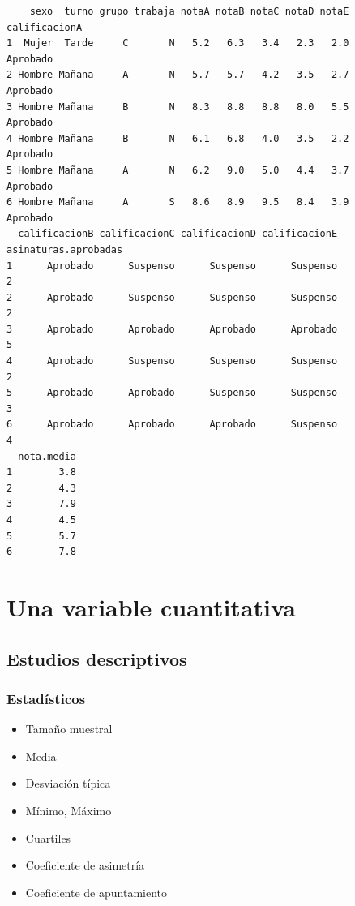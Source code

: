 \documentclass[
  spanish,
  a4paper,
]{scrreport}
\providecommand{\tightlist}{%
  \setlength{\itemsep}{0pt}\setlength{\parskip}{0pt}}
\theoremstyle{definition}
\theoremstyle{definition}
\theoremstyle{remark}
\begin{document}
\begin{verbatim}
    sexo  turno grupo trabaja notaA notaB notaC notaD notaE calificacionA
1  Mujer  Tarde     C       N   5.2   6.3   3.4   2.3   2.0      Aprobado
2 Hombre Mañana     A       N   5.7   5.7   4.2   3.5   2.7      Aprobado
3 Hombre Mañana     B       N   8.3   8.8   8.8   8.0   5.5      Aprobado
4 Hombre Mañana     B       N   6.1   6.8   4.0   3.5   2.2      Aprobado
5 Hombre Mañana     A       N   6.2   9.0   5.0   4.4   3.7      Aprobado
6 Hombre Mañana     A       S   8.6   8.9   9.5   8.4   3.9      Aprobado
  calificacionB calificacionC calificacionD calificacionE asinaturas.aprobadas
1      Aprobado      Suspenso      Suspenso      Suspenso                    2
2      Aprobado      Suspenso      Suspenso      Suspenso                    2
3      Aprobado      Aprobado      Aprobado      Aprobado                    5
4      Aprobado      Suspenso      Suspenso      Suspenso                    2
5      Aprobado      Aprobado      Suspenso      Suspenso                    3
6      Aprobado      Aprobado      Aprobado      Suspenso                    4
  nota.media
1        3.8
2        4.3
3        7.9
4        4.5
5        5.7
6        7.8
\end{verbatim}

\section{Una variable cuantitativa}\label{una-variable-cuantitativa}

\subsection{Estudios descriptivos}\label{estudios-descriptivos}

\subsubsection{Estadísticos}\label{estaduxedsticos}

\begin{itemize}
\tightlist
\item
  Tamaño muestral
\item
  Media
\item
  Desviación típica
\item
  Mínimo, Máximo
\item
  Cuartiles
\item
  Coeficiente de asimetría
\item
  Coeficiente de apuntamiento
\end{itemize}
\end{document}
